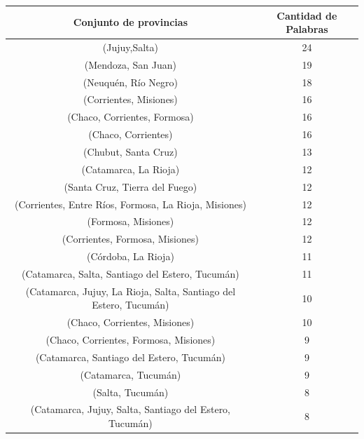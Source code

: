 \begin{table}[]
\centering

\begin{tabular}{|c|c|}
\hline
Conjunto de provincias                                 & Cantidad de Palabras  \\ \hline
(Jujuy,Salta)                                          & 24          \\
(Mendoza, San Juan)                                    & 19          \\
(Neuquén, Río Negro)                                   & 18          \\
(Corrientes, Misiones)                                 & 16          \\
(Chaco, Corrientes, Formosa)                           & 16          \\
(Chaco, Corrientes)                                    & 16          \\
(Chubut, Santa Cruz)                                   & 13          \\
(Catamarca, La Rioja)                                  & 12          \\
(Santa Cruz, Tierra del Fuego)                         & 12          \\
(Corrientes, Entre Ríos, Formosa, La Rioja, Misiones)  & 12          \\  %
(Formosa, Misiones)                                    & 12          \\
(Corrientes, Formosa, Misiones)                        & 12          \\
(Córdoba, La Rioja)                                    & 11          \\
(Catamarca, Salta, Santiago del Estero, Tucumán)       & 11          \\
(Catamarca, Jujuy, La Rioja, Salta, Santiago del Estero, Tucumán) & 10          \\
(Chaco, Corrientes, Misiones)                          & 10          \\
(Chaco, Corrientes, Formosa, Misiones)                 & 9           \\
(Catamarca, Santiago del Estero, Tucumán)              & 9           \\
(Catamarca, Tucumán)                                   & 9           \\
(Salta, Tucumán)                                       & 8           \\
(Catamarca, Jujuy, Salta, Santiago del Estero, Tucumán)& 8           \\

\end{tabular}
\end{table}
